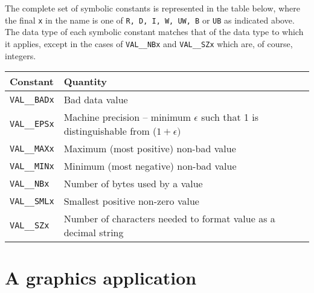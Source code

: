 \documentclass[twoside,11pt,nolof]{starlink}
\begin{document}
The complete set of symbolic constants is represented in the table below,
where the final \texttt{x}  in the name is one of
\texttt{R, D, I, W, UW, B} or \texttt{UB}  as indicated above.
The data type of each symbolic constant matches that of the
data type to which it applies, except in the cases of
\texttt{VAL\_\_NBx} and \texttt{VAL\_\_SZx} which are, of course, integers.
\begin{center}
\begin{tabular}{|l|l|} \hline
\textbf{Constant   }& \textbf{Quantity }\\ \hline
\texttt{VAL\_\_BADx}        & Bad data value\\
\texttt{VAL\_\_EPSx}        & Machine precision -- minimum $\epsilon$ such that
1 is distinguishable from ($1+\epsilon)$\\
\texttt{VAL\_\_MAXx}        & Maximum (most positive) non-bad value\\
\texttt{VAL\_\_MINx}        & Minimum (most negative) non-bad value\\
\texttt{VAL\_\_NBx}         & Number of bytes used by a value\\
\texttt{VAL\_\_SMLx}        & Smallest positive non-zero value\\
\texttt{VAL\_\_SZx}         & Number of characters needed to format value as a decimal string\\
\hline
\end{tabular}
\end{center}

\newpage
\section{A graphics application\label{graph}}
\end{document}
